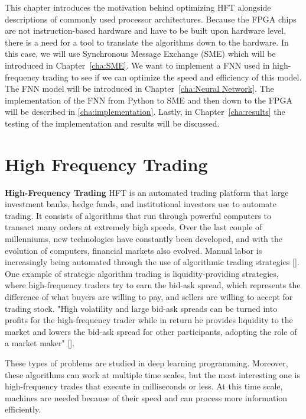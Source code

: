 {This chapter introduces the motivation behind optimizing HFT  alongside descriptions of commonly used processor architectures. Because the FPGA chips are not instruction-based hardware and have to be built upon hardware level, there is a need for a tool to translate the algorithms down to the hardware. In this case, we will use Synchronous Message Exchange (SME) which will be introduced in Chapter~\ref{cha:SME}. We want to implement a \acrshort{FNN} used in high-frequency trading to see if we can optimize the speed and efficiency of this model. The FNN model will be introduced in Chapter~\ref{cha:Neural Network}. The implementation of the FNN from Python to SME and then down to the FPGA will be described in \ref{cha:implementation}.
  Lastly, in Chapter~\ref{cha:results} the testing of the implementation and results will be discussed.
 
  \hypersetup{linkcolor=linkblue}
}



\section{High Frequency Trading}
\textbf{High-Frequency Trading} \acrshort{HFT} is an automated trading platform that large investment banks, hedge funds, and institutional investors use to automate trading. It consists of algorithms that run through powerful computers to transact many orders at extremely high speeds.
Over the last couple of millenniums, new technologies have constantly been developed, and with the evolution of computers, financial markets also evolved. Manual labor is increasingly being automated through the use of algorithmic trading strategies [\cite{gianluca2017high}].
One example of strategic algorithm trading is liquidity-providing strategies, where high-frequency traders try to earn
the bid-ask spread, which represents the difference of what
buyers are willing to pay, and sellers are willing to accept for
trading stock. "High volatility and large bid-ask spreads can be
turned into profits for the high-frequency trader while in return
he provides liquidity to the market and lowers the bid-ask
spread for other participants, adopting the role of a market
maker" [\cite{leber2011high}].

These types of problems are studied in deep learning programming. Moreover, these algorithms can work at multiple time scales, but the most interesting one is high-frequency trades that execute in milliseconds or less. At this time scale, machines are needed because of their speed and can process more information efficiently.

